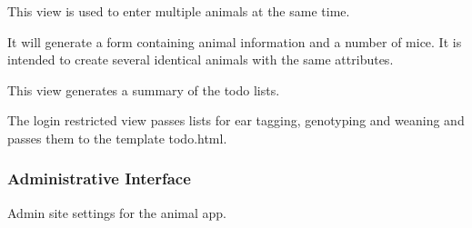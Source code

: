 \documentclass[letterpaper,10pt,english]{sphinxmanual}
\begin{document}

\begin{fulllineitems}
\label{animals:mousedb.animal.views.multiple_pups}
This view is used to enter multiple animals at the same time.

It will generate a form containing animal information and a number of mice.  It is intended to create several identical animals with the same attributes.

\end{fulllineitems}


\begin{fulllineitems}
\label{animals:mousedb.animal.views.todo}
This view generates a summary of the todo lists.

The login restricted view passes lists for ear tagging, genotyping and weaning and passes them to the template todo.html.

\end{fulllineitems}



\subsubsection{Administrative Interface}
\label{animals:administrative-interface}\label{animals:module-mousedb.animal.admin}
Admin site settings for the animal app.
\end{document}
